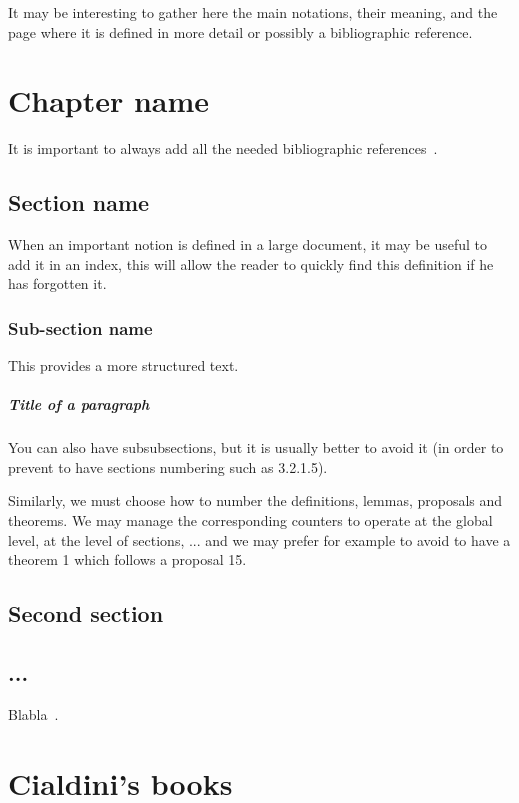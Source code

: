 \documentclass[11pt,a4paper,oneside]{book}
\begin{document}
It may be interesting to gather here the main notations, their meaning, and the page where it is defined in more detail or possibly a bibliographic reference.

\chapter{Chapter name}

It is important to always add all the needed bibliographic
references~\cite{Hadnagy,ref3}.

\section{Section name}

When an important notion is defined in a large document, it may be useful to add it in an index, this will allow the reader to quickly find this definition if he has forgotten it.

\subsection{Sub-section name}

This provides a more structured text.

\paragraph{Title of a paragraph}

You can also have subsubsections, but it is usually better to avoid it (in order to prevent to have  sections numbering such as 3.2.1.5).

Similarly, we must choose how to number the definitions, lemmas, proposals and theorems. We may manage the corresponding counters to operate at the global level, at the level of sections, ... and we may prefer for example to avoid to have a theorem 1 which follows a proposal 15.

\section{Second section}

\section{...}Blabla~\cite{ref2}.

\chapter{Cialdini's books}
\end{document}
